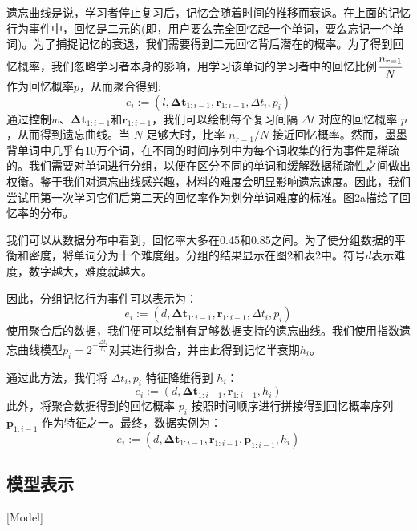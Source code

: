遗忘曲线是说，学习者停止复习后，记忆会随着时间的推移而衰退。在上面的记忆行为事件中，回忆是二元的(即，用户要么完全回忆起一个单词，要么忘记一个单词)。为了捕捉记忆的衰退，我们需要得到二元回忆背后潜在的概率。为了得到回忆概率，我们忽略学习者本身的影响，用学习该单词的学习者中的回忆比例$\cfrac{n_{r=1}}{N}$作为回忆概率$p$，从而聚合得到:
\begin{equation}
e_{i} :=(l, \boldsymbol{\Delta t}_{1:i-1}, \boldsymbol r_{1:i-1}, \Delta t_i , p_i)
\end{equation}
通过控制$w$、$\boldsymbol{\Delta t}_{1:i-1}$和$\boldsymbol r_{1:i-1}$，我们可以绘制每个复习间隔 $\Delta t$ 对应的回忆概率 $p$，从而得到遗忘曲线。当 $N$ 足够大时，比率 $n_{r=1}/N$ 接近回忆概率。然而，墨墨背单词中几乎有10万个词，在不同的时间序列中为每个词收集的行为事件是稀疏的。我们需要对单词进行分组，以便在区分不同的单词和缓解数据稀疏性之间做出权衡。鉴于我们对遗忘曲线感兴趣，材料的难度会明显影响遗忘速度。因此，我们尝试用第一次学习它们后第二天的回忆率作为划分单词难度的标准。图2a描绘了回忆率的分布。

我们可以从数据分布中看到，回忆率大多在0.45和0.85之间。为了使分组数据的平衡和密度，将单词分为十个难度组。分组的结果显示在图2和表2中。符号$d$表示难度，数字越大，难度就越大。

因此，分组记忆行为事件可以表示为：
\begin{equation}
e_{i} :=(d, \boldsymbol{\Delta t}_{1:i-1}, \boldsymbol r_{1:i-1}, \Delta t_i , p_i)
\end{equation}
使用聚合后的数据，我们便可以绘制有足够数据支持的遗忘曲线。我们使用指数遗忘曲线模型$p_i = 2^{-\frac{\Delta t_i}{h_i}}$对其进行拟合，并由此得到记忆半衰期$h_i$。

通过此方法，我们将 $\Delta t_i , p_i$ 特征降维得到 $h_i$：
\begin{equation}
e_{i} :=(d, \boldsymbol{\Delta t}_{1:i-1}, \boldsymbol r_{1:i-1}, h_i)
\end{equation}
此外，将聚合数据得到的回忆概率 $p_i$ 按照时间顺序进行拼接得到回忆概率序列 $\boldsymbol p_{1:i-1}$ 作为特征之一。最终，数据实例为：
\begin{equation}
e_{i}:=(d, \boldsymbol{\Delta t}_{1:i-1}, \boldsymbol r_{1:i-1}, \boldsymbol p_{1:i-1}, h_i)
\end{equation}

\subsection{模型表示}[Model]

